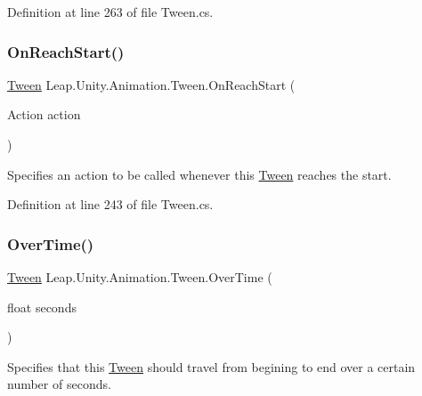 Definition at line 263 of file Tween.\+cs.

\mbox{\label{struct_leap_1_1_unity_1_1_animation_1_1_tween_af996cdf4236de2395c88bd0ba0fe65fb}} 
\subsubsection{\texorpdfstring{OnReachStart()}{OnReachStart()}}
{\footnotesize\ttfamily \mbox{\hyperlink{struct_leap_1_1_unity_1_1_animation_1_1_tween}{Tween}} Leap.\+Unity.\+Animation.\+Tween.\+On\+Reach\+Start (\begin{DoxyParamCaption}\item[{Action}]{action }\end{DoxyParamCaption})}



Specifies an action to be called whenever this \mbox{\hyperlink{struct_leap_1_1_unity_1_1_animation_1_1_tween}{Tween}} reaches the start. 



Definition at line 243 of file Tween.\+cs.

\mbox{\label{struct_leap_1_1_unity_1_1_animation_1_1_tween_a233ad9426dc52f71fd5ac36500946d76}} 
\subsubsection{\texorpdfstring{OverTime()}{OverTime()}}
{\footnotesize\ttfamily \mbox{\hyperlink{struct_leap_1_1_unity_1_1_animation_1_1_tween}{Tween}} Leap.\+Unity.\+Animation.\+Tween.\+Over\+Time (\begin{DoxyParamCaption}\item[{float}]{seconds }\end{DoxyParamCaption})}



Specifies that this \mbox{\hyperlink{struct_leap_1_1_unity_1_1_animation_1_1_tween}{Tween}} should travel from begining to end over a certain number of seconds. 



